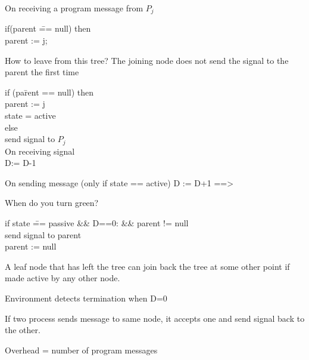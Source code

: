 \documentclass[twoside]{article}
\begin{document}
On receiving a program message from $P_j$
\begin{tabbing}
if(parent \= == null) then\\
\> parent := j;
\end{tabbing} 
 
How to leave from this tree?\newline
The joining node does not send the signal to the parent the first time
\begin{tabbing}
if (pa\=rent == null) then \\
\> parent := j\\
\>state = active \\
else \=\\
\>send signal to $P_j$ \\
\>On receiving signal \\
\>D:= D-1
\end{tabbing}    


On sending message (only if state == active)\newline
    D := D+1 ==> 

When do you turn green?
\begin{tabbing}
if state \= == passive \&\& D==0: \&\& parent != null\\
\>send signal to parent\\
\>parent := null
\end{tabbing}

A leaf node that has left the tree can join back the tree at some other point if made active by any other node.

Environment detects termination when D=0

If two process sends message to same node, it accepts one and send signal back to the other.

Overhead = number of program messages
\end{document}
